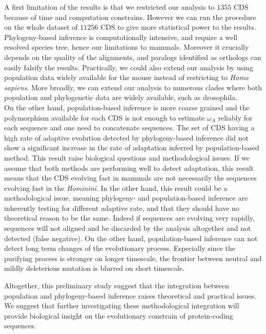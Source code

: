 \documentclass[10pt]{article}
\begin{document}
\begin{multicols}{2}
	A first limitation of the results is that we restricted our analysis to $1355$ CDS because of time and computation constrains. However we can run the procedure on the whole dataset of $11256$ CDS to give more statistical power to the results. Phylogeny-based inference is computationally intensive, and require a well resolved species tree, hence our limitations to mammals. Moreover it crucially depends on the quality of the alignments, and paralogs identified as orthologs can easily falsify the results. Practically, we could also extend our analysis by using population data widely available for the mouse instead of restricting to \textit{Homo sapiens}. More broadly, we can extend our analysis to numerous clades where both population and phylogenetic data are widely available, such as drosophila. \\
	
	On the other hand, population-based inference is more coarse grained and the polymorphism available for each CDS is not enough to estimate $\omega_A$ reliably for each sequence and one need to concatenate sequences. The set of CDS having a high rate of adaptive evolution detected by phylogeny-based inference did not show a significant increase in the rate of adaptation inferred by population-based method. This result raise biological questions and methodological issues. If we assume that both methods are performing well to detect adaptation, this result means that the CDS evolving fast in mammals are not necessarily the sequences evolving fast in the \textit{Hominini}. In the other hand, this result could be a methodological issue, meaning phylogeny- and population-based inference are inherently testing for different adaptive rate, and that they should have no theoretical reason to be the same. Indeed if sequences are evolving very rapidly, sequences will not aligned and be discarded by the analysis altogether and not detected (false negative). On the other hand, population-based inference can not detect long term changes of the evolutionary process. Especially since the purifying process is stronger on longer timescale, the frontier between neutral and mildly deleterious mutation is blurred on short timescale. 
	
	Altogether, this preliminary study suggest that the integration between population and phylogeny-based inference raises theoretical and practical issues. We suggest that further investigating these methodological integration will provide biological insight on the evolutionary constrain of protein-coding sequences. \\
	

\end{multicols}
\end{document}
